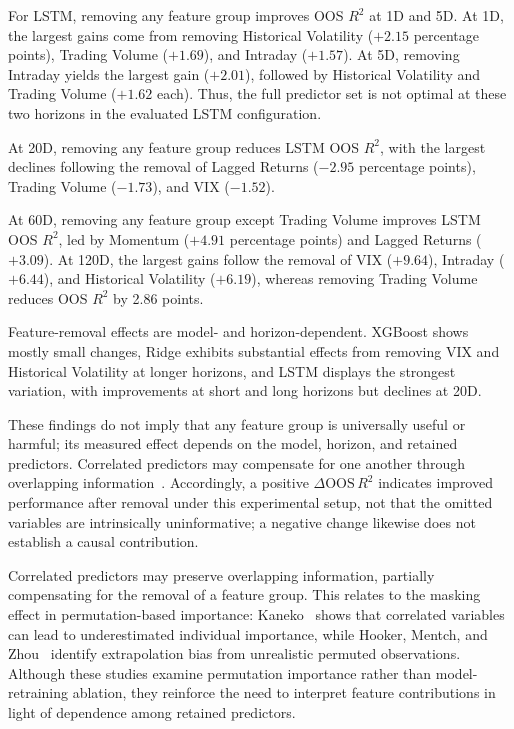 \documentclass[runningheads,orivec]{llncs}
\begin{document}
For LSTM, removing any feature group improves OOS $R^2$ at 1D and 5D. At 1D, the largest gains come from removing Historical Volatility ($+2.15$ percentage points), Trading Volume ($+1.69$), and Intraday ($+1.57$). At 5D, removing Intraday yields the largest gain ($+2.01$), followed by Historical Volatility and Trading Volume ($+1.62$ each). Thus, the full predictor set is not optimal at these two horizons in the evaluated LSTM configuration.

At 20D, removing any feature group reduces LSTM OOS $R^2$, with the largest declines following the removal of Lagged Returns ($-2.95$ percentage points), Trading Volume ($-1.73$), and VIX ($-1.52$).

At 60D, removing any feature group except Trading Volume improves LSTM OOS $R^2$, led by Momentum ($+4.91$ percentage points) and Lagged Returns ($+3.09$). At 120D, the largest gains follow the removal of VIX ($+9.64$), Intraday ($+6.44$), and Historical Volatility ($+6.19$), whereas removing Trading Volume reduces OOS $R^2$ by 2.86 points.

Feature-removal effects are model- and horizon-dependent. XGBoost shows mostly small changes, Ridge exhibits substantial effects from removing VIX and Historical Volatility at longer horizons, and LSTM displays the strongest variation, with improvements at short and long horizons but declines at 20D.

These findings do not imply that any feature group is universally useful or harmful; its measured effect depends on the model, horizon, and retained predictors. Correlated predictors may compensate for one another through overlapping information~\cite{hooker2021}. Accordingly, a positive $\Delta \mathrm{OOS}\,R^2$ indicates improved performance after removal under this experimental setup, not that the omitted variables are intrinsically uninformative; a negative change likewise does not establish a causal contribution.

Correlated predictors may preserve overlapping information, partially compensating for the removal of a feature group. This relates to the masking effect in permutation-based importance: Kaneko~\cite{kaneko2022} shows that correlated variables can lead to underestimated individual importance, while Hooker, Mentch, and Zhou~\cite{hooker2021} identify extrapolation bias from unrealistic permuted observations. Although these studies examine permutation importance rather than model-retraining ablation, they reinforce the need to interpret feature contributions in light of dependence among retained predictors.
\end{document}
